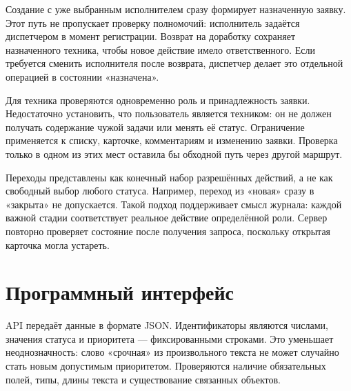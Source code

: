 \documentclass{timcw}
\begin{document}
Создание с уже выбранным исполнителем сразу формирует назначенную заявку. Этот путь не пропускает проверку полномочий: исполнитель задаётся диспетчером в момент регистрации. Возврат на доработку сохраняет назначенного техника, чтобы новое действие имело ответственного. Если требуется сменить исполнителя после возврата, диспетчер делает это отдельной операцией в состоянии «назначена».

Для техника проверяются одновременно роль и принадлежность заявки. Недостаточно установить, что пользователь является техником: он не должен получать содержание чужой задачи или менять её статус. Ограничение применяется к списку, карточке, комментариям и изменению заявки. Проверка только в одном из этих мест оставила бы обходной путь через другой маршрут.

Переходы представлены как конечный набор разрешённых действий, а не как свободный выбор любого статуса. Например, переход из «новая» сразу в «закрыта» не допускается. Такой подход поддерживает смысл журнала: каждой важной стадии соответствует реальное действие определённой роли. Сервер повторно проверяет состояние после получения запроса, поскольку открытая карточка могла устареть.

\section{Программный интерфейс}

API передаёт данные в формате JSON. Идентификаторы являются числами, значения статуса и приоритета — фиксированными строками. Это уменьшает неоднозначность: слово «срочная» из произвольного текста не может случайно стать новым допустимым приоритетом. Проверяются наличие обязательных полей, типы, длины текста и существование связанных объектов.
\end{document}
